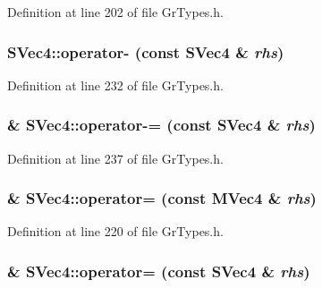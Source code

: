 Definition at line 202 of file GrTypes.h.\hypertarget{struct_s_vec4_a0fb27aaa9db6c0ad3fd313c7d1f8832}{
\subsubsection[{operator-}]{ SVec4::operator- (const {\bf SVec4} \& {\em rhs})}}
\label{struct_s_vec4_a0fb27aaa9db6c0ad3fd313c7d1f8832}




Definition at line 232 of file GrTypes.h.\hypertarget{struct_s_vec4_58f5761ebfb64b825c6b19e5f860261b}{
\subsubsection[{operator-=}]{\& SVec4::operator-= (const {\bf SVec4} \& {\em rhs})}}
\label{struct_s_vec4_58f5761ebfb64b825c6b19e5f860261b}




Definition at line 237 of file GrTypes.h.\hypertarget{struct_s_vec4_1c00e84244ce1734a291a4f314b7eea5}{
\subsubsection[{operator=}]{\& SVec4::operator= (const {\bf MVec4} \& {\em rhs})}}
\label{struct_s_vec4_1c00e84244ce1734a291a4f314b7eea5}




Definition at line 220 of file GrTypes.h.\hypertarget{struct_s_vec4_7fa30a8577fcfdf823384fd394002a62}{
\subsubsection[{operator=}]{\& SVec4::operator= (const {\bf SVec4} \& {\em rhs})}}
\label{struct_s_vec4_7fa30a8577fcfdf823384fd394002a62}





